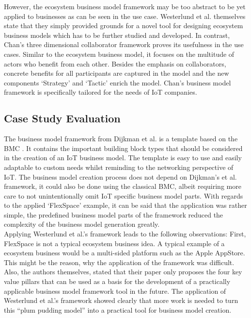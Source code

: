 		However, the ecosystem business model framework may be too abstract to be yet applied to businesses as can be seen in the use case. Westerlund et al. themselves state that they simply provided grounds for a novel tool for designing ecosystem business models which has to be further studied and developed. In contrast, Chan's three dimensional collaborator framework proves its usefulness in the use cases. Similar to the ecosystem business model, it focuses on the multitude of actors who benefit from each other. Besides the emphasis on collaborators, concrete benefits for all participants are captured in the model and the new components `Strategy' and `Tactic' enrich the model. Chan's business model framework is specifically tailored for the needs of IoT companies.
	\vspace{-2em}
	\subsection{Case Study Evaluation}
	\vspace{-1em}
		The business model framework from Dijkman et al. \cite{dijkman} is a template based on the BMC \cite{bmc}. It contains the important building block types that should be considered in the creation of an IoT business model. The template is easy to use and easily adaptable to custom needs whilst reminding to the networking perspective of IoT. The business model creation process does not depend on Dijkman's et al. framework, it could also be done using the classical BMC, albeit requiring more care to not unintentionally omit IoT specific business model parts.
		With regards to the applied `FlexSpace' example, it can be said that the application was rather simple, the predefined business model parts of the framework reduced the complexity of the business model generation greatly.\\
		Applying Westerlund et al.'s framework leads to the following observations: First, FlexSpace is not a typical ecosystem business idea. A typical example of a ecosystem business would be a multi-sided platform such as the Apple AppStore. This might be the reason, why the application of the framework was difficult. Also, the authors themselves, stated that their paper only proposes the four key value pillars that can be used as a basis for the development of a practically applicable business model framework tool in the future. The application of Westerlund et al.'s framework showed clearly that more work is needed to turn this ``plum pudding model'' \cite{westerlund} into a practical tool for business model creation.\\
